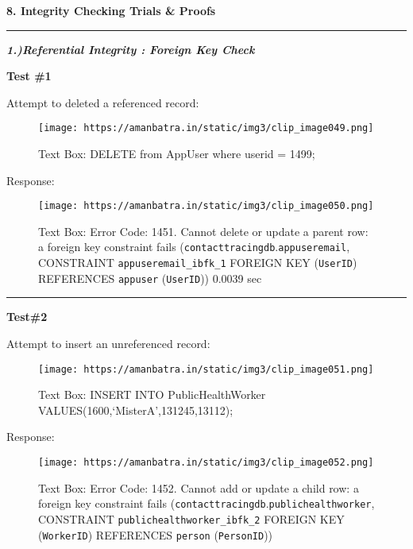 \documentclass[
]{article}
\begin{document}
\textbf{8. Integrity Checking Trials \& Proofs}

\begin{center}\rule{0.5\linewidth}{0.5pt}\end{center}

\textbf{\emph{1.)Referential Integrity : Foreign Key Check}}

\textbf{Test \#1}

Attempt to deleted a referenced record:

\begin{figure}
\centering
\texttt{[image: https://amanbatra.in/static/img3/clip\_image049.png]}
\caption{Text Box: DELETE from AppUser where userid = 1499;}
\end{figure}

Response:

\begin{figure}
\centering
\texttt{[image: https://amanbatra.in/static/img3/clip\_image050.png]}
\caption{Text Box: Error Code: 1451. Cannot delete or update a parent
row: a foreign key constraint fails
(\texttt{contacttracingdb}.\texttt{appuseremail}, CONSTRAINT
\texttt{appuseremail\_ibfk\_1} FOREIGN KEY (\texttt{UserID}) REFERENCES
\texttt{appuser} (\texttt{UserID})) 0.0039 sec}
\end{figure}

\begin{center}\rule{0.5\linewidth}{0.5pt}\end{center}

\textbf{Test\#2}

Attempt to insert an unreferenced record:

\begin{figure}
\centering
\texttt{[image: https://amanbatra.in/static/img3/clip\_image051.png]}
\caption{Text Box: INSERT INTO PublicHealthWorker
VALUES(1600,`MisterA',131245,13112);}
\end{figure}

Response:

\begin{figure}
\centering
\texttt{[image: https://amanbatra.in/static/img3/clip\_image052.png]}
\caption{Text Box: Error Code: 1452. Cannot add or update a child row: a
foreign key constraint fails
(\texttt{contacttracingdb}.\texttt{publichealthworker}, CONSTRAINT
\texttt{publichealthworker\_ibfk\_2} FOREIGN KEY (\texttt{WorkerID})
REFERENCES \texttt{person} (\texttt{PersonID}))}
\end{figure}
\end{document}
